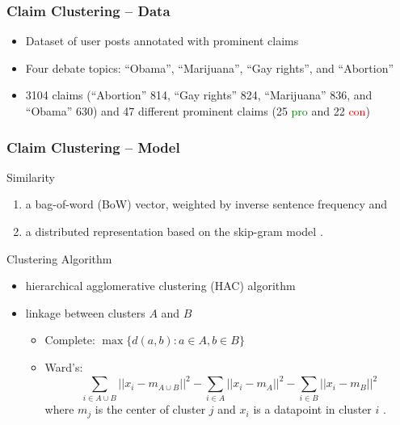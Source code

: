 \documentclass{beamer}
\begin{document}

\begin{frame}
	\frametitle{Claim Clustering -- Data}
	\begin{itemize}
		\item Dataset of user posts annotated with prominent claims \cite{hasan2014you}
		\item Four debate topics: 
		``Obama'', ``Marijuana'', ``Gay rights'', and ``Abortion'' 
	\item 3104 claims (``Abortion'' 814, ``Gay rights'' 824, ``Marijuana'' 836, and ``Obama'' 630) and 
		47 different prominent claims (25 \textcolor{green}{pro} and 22 \textcolor{red}{con})
	\end{itemize}
\end{frame}


\begin{frame}
	\frametitle{Claim Clustering -- Model}
	Similarity
\begin{enumerate} 
\item a bag-of-word (BoW) vector, weighted
by inverse sentence frequency \cite{ramage2009random} and 
\item a distributed representation based on the skip-gram model
	\cite{mikolov2013distributed}. 
\end{enumerate}
\vspace{0.5cm}
Clustering Algorithm
\begin{itemize}
	\item hierarchical agglomerative clustering (HAC) algorithm \cite{szekely2005hierarchical}
	\item linkage between clusters $A$ and $B$
		\begin{itemize}
			\item Complete: $\max \{d(a, b): a \in A, b \in B\}$
			\item Ward's:
		$$
		\sum_{i \in A \cup B} ||x_i - m_{A \cup B}||^2 - \sum_{i \in A}||x_i - m_A||^2 
		- \sum_{i \in B} ||x_i - m_B||^2
		$$ 
		where $m_j$ is the center of cluster $j$  and $x_i$ is a datapoint
		in cluster $i$ \cite{ward1963hierarchical}.
		\end{itemize}
\end{itemize}
\end{frame}
\end{document}
